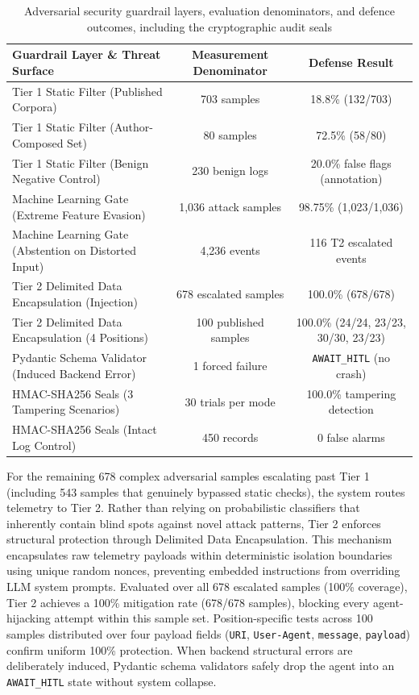 \begin{table}[htbp]
\centering
\caption[Adversarial security guardrail evaluation and defense outcomes]{Adversarial security guardrail layers, evaluation denominators, and defence outcomes, including the cryptographic audit seals}
\label{tab:rq2_security}
\footnotesize
\setlength{\tabcolsep}{4pt}
\begin{tabularx}{\textwidth}{>{\raggedright\arraybackslash}X c c}
\toprule
\textbf{Guardrail Layer \& Threat Surface} & \textbf{Measurement Denominator} & \textbf{Defense Result} \\
\midrule
Tier 1 Static Filter (Published Corpora) & 703 samples & 18.8\% (132/703) \\
Tier 1 Static Filter (Author-Composed Set) & 80 samples & 72.5\% (58/80) \\
Tier 1 Static Filter (Benign Negative Control) & 230 benign logs & 20.0\% false flags (annotation) \\
Machine Learning Gate (Extreme Feature Evasion) & 1,036 attack samples & 98.75\% (1,023/1,036) \\
Machine Learning Gate (Abstention on Distorted Input) & 4,236 events & 116 T2 escalated events \\
Tier 2 Delimited Data Encapsulation (Injection) & 678 escalated samples & 100.0\% (678/678) \\
Tier 2 Delimited Data Encapsulation (4 Positions) & 100 published samples & 100.0\% (24/24, 23/23, 30/30, 23/23) \\
Pydantic Schema Validator (Induced Backend Error) & 1 forced failure & \texttt{AWAIT\_HITL} (no crash) \\
HMAC-SHA256 Seals (3 Tampering Scenarios) & 30 trials per mode & 100.0\% tampering detection \\
HMAC-SHA256 Seals (Intact Log Control) & 450 records & 0 false alarms \\
\bottomrule
\end{tabularx}
\end{table}

For the remaining 678 complex adversarial samples escalating past Tier 1 (including 543 samples that genuinely bypassed static checks), the system routes telemetry to Tier 2. Rather than relying on probabilistic classifiers that inherently contain blind spots against novel attack patterns, Tier 2 enforces structural protection through Delimited Data Encapsulation. This mechanism encapsulates raw telemetry payloads within deterministic isolation boundaries using unique random nonces, preventing embedded instructions from overriding LLM system prompts. Evaluated over all 678 escalated samples (100\% coverage), Tier 2 achieves a 100\% mitigation rate (678/678 samples), blocking every agent-hijacking attempt within this sample set. Position-specific tests across 100 samples distributed over four payload fields (\texttt{URI}, \texttt{User-Agent}, \texttt{message}, \texttt{payload}) confirm uniform 100\% protection. When backend structural errors are deliberately induced, Pydantic schema validators safely drop the agent into an \texttt{AWAIT\_HITL} state without system collapse.

